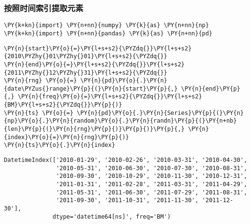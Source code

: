     \hypertarget{ux6309ux7167ux65f6ux95f4ux7d22ux5f15ux63d0ux53d6ux5143ux7d20}{%
\subsubsection{按照时间索引提取元素}\label{ux6309ux7167ux65f6ux95f4ux7d22ux5f15ux63d0ux53d6ux5143ux7d20}}

    \begin{tcolorbox}[breakable, size=fbox, boxrule=1pt, pad at break*=1mm,colback=cellbackground, colframe=cellborder]
\begin{Verbatim}[commandchars=\\\{\}]
\PY{k+kn}{import} \PY{n+nn}{numpy} \PY{k}{as} \PY{n+nn}{np}
\PY{k+kn}{import} \PY{n+nn}{pandas} \PY{k}{as} \PY{n+nn}{pd}
\end{Verbatim}
\end{tcolorbox}

    \begin{tcolorbox}[breakable, size=fbox, boxrule=1pt, pad at break*=1mm,colback=cellbackground, colframe=cellborder]
\begin{Verbatim}[commandchars=\\\{\}]
\PY{n}{start}\PY{o}{=}\PY{l+s+s2}{\PYZdq{}}\PY{l+s+s2}{2010\PYZhy{}01\PYZhy{}01}\PY{l+s+s2}{\PYZdq{}}
\PY{n}{end}\PY{o}{=}\PY{l+s+s2}{\PYZdq{}}\PY{l+s+s2}{2011\PYZhy{}12\PYZhy{}31}\PY{l+s+s2}{\PYZdq{}}
\PY{n}{rng} \PY{o}{=} \PY{n}{pd}\PY{o}{.}\PY{n}{date\PYZus{}range}\PY{p}{(}\PY{n}{start}\PY{p}{,} \PY{n}{end}\PY{p}{,} \PY{n}{freq}\PY{o}{=}\PY{l+s+s2}{\PYZdq{}}\PY{l+s+s2}{BM}\PY{l+s+s2}{\PYZdq{}}\PY{p}{)}
\PY{n}{ts} \PY{o}{=} \PY{n}{pd}\PY{o}{.}\PY{n}{Series}\PY{p}{(}\PY{n}{np}\PY{o}{.}\PY{n}{random}\PY{o}{.}\PY{n}{randn}\PY{p}{(}\PY{n+nb}{len}\PY{p}{(}\PY{n}{rng}\PY{p}{)}\PY{p}{)}\PY{p}{,} \PY{n}{index}\PY{o}{=}\PY{n}{rng}\PY{p}{)}
\PY{n}{ts}\PY{o}{.}\PY{n}{index}
\end{Verbatim}
\end{tcolorbox}

            \begin{tcolorbox}[breakable, size=fbox, boxrule=.5pt, pad at break*=1mm, opacityfill=0]
\begin{Verbatim}[commandchars=\\\{\}]
DatetimeIndex(['2010-01-29', '2010-02-26', '2010-03-31', '2010-04-30',
               '2010-05-31', '2010-06-30', '2010-07-30', '2010-08-31',
               '2010-09-30', '2010-10-29', '2010-11-30', '2010-12-31',
               '2011-01-31', '2011-02-28', '2011-03-31', '2011-04-29',
               '2011-05-31', '2011-06-30', '2011-07-29', '2011-08-31',
               '2011-09-30', '2011-10-31', '2011-11-30', '2011-12-30'],
              dtype='datetime64[ns]', freq='BM')
\end{Verbatim}
\end{tcolorbox}
        
